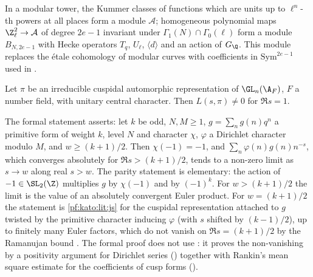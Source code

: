 \begin{remark}\label{pf:kato:rem:towermodule}
In a modular tower, the Kummer classes of functions which are units up to $\ell^n$-th powers at all places form a module $\mathcal A$;
homogeneous polynomial maps $\Z_\ell^2\to\mathcal A$ of degree $2e-1$ invariant under $\Gamma_1(N)\cap\Gamma_0(\ell)$ form a module $B_{N,2e-1}$
with Hecke operators $T_q$, $U_\ell$, $\langle d\rangle$ and an action of $G_\Q$. This module replaces the \'etale cohomology of modular curves
with coefficients in $\mathrm{Sym}^{2e-1}$ used in \cite{Kato2004}.
\end{remark}

\begin{littheorem}\label{pf:kato:lit:js}
Let $\pi$ be an irreducible cuspidal automorphic representation of $\GL_n(\A_F)$, $F$ a number field, with unitary central character.
Then $L(s,\pi)\ne0$ for $\Re s=1$.
\end{littheorem}

\begin{remark}\label{pf:kato:rem:js}
The formal statement asserts: let $k$ be odd, $N,M\ge1$, $g=\sum_ng(n)q^n$ a primitive form of weight $k$, level $N$ and character $\chi$,
$\varphi$ a Dirichlet character modulo $M$, and $w\ge(k+1)/2$. Then $\chi(-1)=-1$, and $\sum_n\varphi(n)g(n)n^{-s}$, which converges absolutely
for $\Re s>(k+1)/2$, tends to a non-zero limit as $s\to w$ along real $s>w$. The parity statement is elementary: the action of $-1\in\SL_2(\Z)$
multiplies $g$ by $\chi(-1)$ and by $(-1)^k$. For $w>(k+1)/2$ the limit is the value of an absolutely convergent Euler product. For
$w=(k+1)/2$ the statement is \cref{pf:kato:lit:js} for the cuspidal representation attached to $g$ twisted by the primitive character
inducing $\varphi$ (with $s$ shifted by $(k-1)/2$), up to finitely many Euler factors, which do not vanish on $\Re s=(k+1)/2$ by the
Ramanujan bound \cite{Deligne1974}. The formal proof does not use \cite{JacquetShalika1976}: it proves the non-vanishing by a positivity
argument for Dirichlet series () together with Rankin's mean square
estimate for the coefficients of cusp forms ().
\end{remark}

